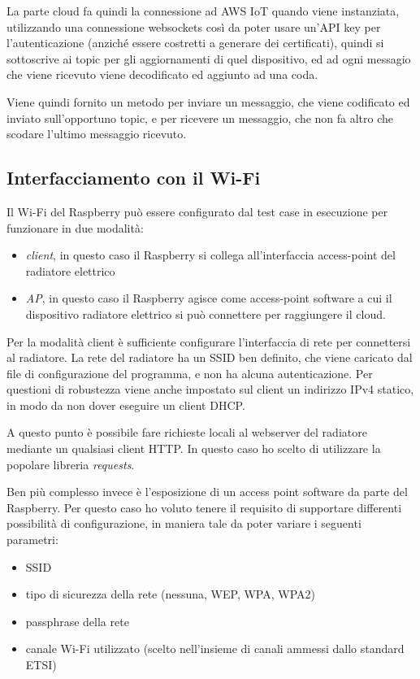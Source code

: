 \documentclass[12pt,a4paper,twoside,titlepage]{book}
\begin{document}
La parte cloud fa quindi la connessione ad AWS IoT quando viene instanziata, utilizzando
una connessione websockets così da poter usare un'API key per l'autenticazione (anziché
essere costretti a generare dei certificati), quindi si sottoscrive ai topic per gli
aggiornamenti di quel dispositivo, ed ad ogni messagio che viene ricevuto viene decodificato
ed aggiunto ad una coda.

Viene quindi fornito un metodo per inviare un messaggio, che viene codificato ed
inviato sull'opportuno topic, e per ricevere un messaggio, che non fa altro che scodare
l'ultimo messaggio ricevuto.


\subsection{Interfacciamento con il Wi-Fi}

Il Wi-Fi del Raspberry può essere configurato dal test case in esecuzione per
funzionare in due modalità:

\begin{itemize}
    \item \textit{client}, in questo caso il Raspberry si collega all'interfaccia
        access-point del radiatore elettrico
    \item \textit{AP}, in questo caso il Raspberry agisce come access-point software
        a cui il dispositivo radiatore elettrico si può connettere per raggiungere il
        cloud.
\end{itemize}

Per la modalità client è sufficiente configurare l'interfaccia di rete per connettersi
al radiatore. La rete del radiatore ha un SSID ben definito, che viene caricato dal
file di configurazione del programma, e non ha alcuna autenticazione. Per questioni
di robustezza viene anche impostato sul client un indirizzo IPv4 statico, in modo da
non dover eseguire un client DHCP.

A questo punto è possibile fare richieste locali al webserver del radiatore mediante
un qualsiasi client HTTP. In questo caso ho scelto di utilizzare la popolare
libreria \textit{requests}.

Ben più complesso invece è l'esposizione di un access point software da parte del
Raspberry. Per questo caso ho voluto tenere il requisito di supportare differenti
possibilità di configurazione, in maniera tale da poter variare i seguenti parametri:
\begin{itemize}
    \item SSID
    \item tipo di sicurezza della rete (nessuna, WEP, WPA, WPA2)
    \item passphrase della rete
    \item canale Wi-Fi utilizzato (scelto nell'insieme di canali ammessi dallo standard ETSI)
\end{itemize}
\end{document}
